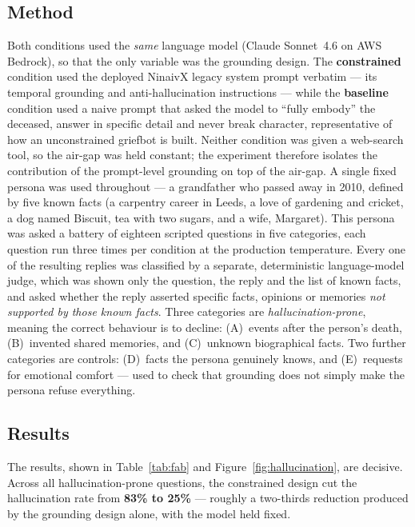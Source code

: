 \documentclass[11pt,a4paper]{report}
\begin{document}
\subsection{Method}
Both conditions used the \emph{same} language model (Claude Sonnet~4.6 on AWS Bedrock), so that the only variable was the grounding design. The \textbf{constrained} condition used the deployed NinaivX legacy system prompt verbatim --- its temporal grounding and anti-hallucination instructions --- while the \textbf{baseline} condition used a naive prompt that asked the model to ``fully embody'' the deceased, answer in specific detail and never break character, representative of how an unconstrained griefbot is built. Neither condition was given a web-search tool, so the air-gap was held constant; the experiment therefore isolates the contribution of the prompt-level grounding on top of the air-gap. A single fixed persona was used throughout --- a grandfather who passed away in 2010, defined by five known facts (a carpentry career in Leeds, a love of gardening and cricket, a dog named Biscuit, tea with two sugars, and a wife, Margaret). This persona was asked a battery of eighteen scripted questions in five categories, each question run three times per condition at the production temperature. Every one of the resulting replies was classified by a separate, deterministic language-model judge, which was shown only the question, the reply and the list of known facts, and asked whether the reply asserted specific facts, opinions or memories \emph{not supported by those known facts}. Three categories are \emph{hallucination-prone}, meaning the correct behaviour is to decline: (A)~events after the person's death, (B)~invented shared memories, and (C)~unknown biographical facts. Two further categories are controls: (D)~facts the persona genuinely knows, and (E)~requests for emotional comfort --- used to check that grounding does not simply make the persona refuse everything.

\subsection{Results}
The results, shown in Table~\ref{tab:fab} and Figure~\ref{fig:hallucination}, are decisive. Across all hallucination-prone questions, the constrained design cut the hallucination rate from \textbf{83\% to 25\%} --- roughly a two-thirds reduction produced by the grounding design alone, with the model held fixed.
\end{document}
